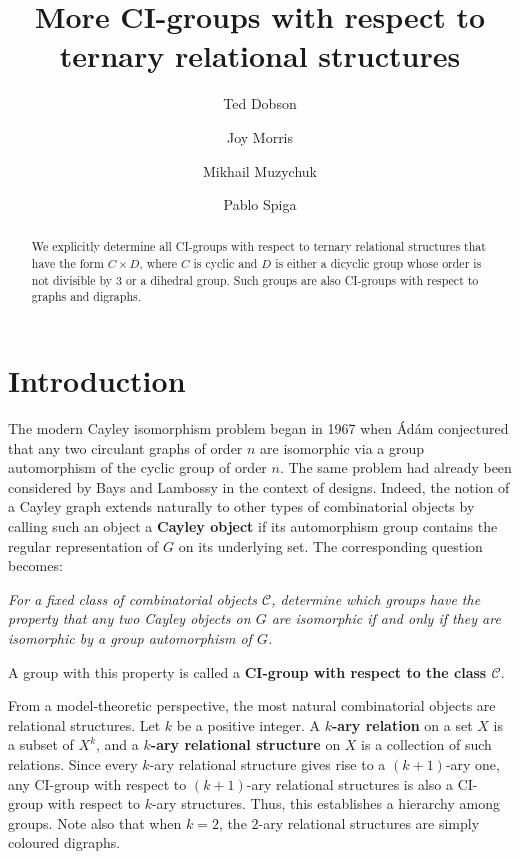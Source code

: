 \documentclass[11pt]{amsart}
\title[CI-groups for ternary structures]{More CI-groups with respect to ternary relational structures}
\author{Ted Dobson}
\author{Joy Morris}
\author{Mikhail Muzychuk}
\author{Pablo Spiga}
\numberwithin{equation}{section}
\theoremstyle{definition}
\begin{document}
	
	
	
	
	\begin{abstract}
		We explicitly determine all CI-groups with respect to ternary relational structures that have the form $C \times D$, where $C$ is cyclic and $D$ is either a dicyclic group whose order is not divisible by $3$ or a dihedral group.  Such groups are also CI-groups with respect to graphs and digraphs.
	\end{abstract}
	
	\maketitle
	
	\section{Introduction}
	The modern Cayley isomorphism problem began in 1967 when \'Ad\'am \cite{Adam1967} conjectured that any two circulant graphs of order $n$ are isomorphic via a group automorphism of the cyclic group of order $n$. The same problem had already been considered by Bays and Lambossy \cite{Bays1931,Lambossy1931} in the context of designs. 
	Indeed, the notion of a Cayley graph extends naturally to other types of combinatorial objects by calling such an object a {\bf Cayley object} if its automorphism group contains the regular representation of $G$ on its underlying set. The corresponding question becomes:
	\begin{center}
		{\it For a fixed class of combinatorial objects $\mathcal{C}$, determine which groups have the property that any two Cayley objects on $G$ are isomorphic if and only if they are isomorphic by a group automorphism of $G$.}
	\end{center}
	A group with this property is called a {\bf CI-group with respect to the class $\mathcal{C}$}.
	
	From a model-theoretic perspective, the most natural combinatorial objects are relational structures. Let $k$ be a positive integer. A {\bf $k$-ary relation} on a set $X$ is a subset of $X^k$, and a {\bf $k$-ary relational structure} on $X$ is a collection of such relations. Since every $k$-ary relational structure gives rise to a $(k+1)$-ary one, any CI-group with respect to $(k+1)$-ary relational structures is also a CI-group with respect to $k$-ary structures. Thus, this establishes a hierarchy among groups. Note also that when $k=2$, the $2$-ary relational structures are simply coloured digraphs. 
	
\end{document}
